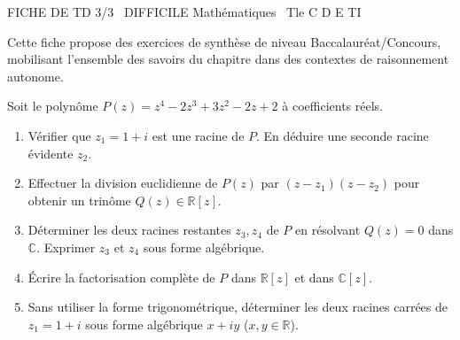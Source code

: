 \documentclass[11pt]{article}
\begin{document}
\begin{tcolorbox}[enhanced,colback=popink,colframe=popink,arc=10pt,boxrule=0pt,left=12pt,right=12pt,top=9pt,bottom=9pt]
{\color{white}\popxbold\small FICHE DE TD 3/3 \textbullet\ DIFFICILE \hfill Mathématiques \textbullet\ Tle C D E TI\par}
\end{tcolorbox}
\vspace{4pt}
Cette fiche propose des exercices de synthèse de niveau Baccalauréat/Concours, mobilisant l'ensemble des savoirs du chapitre dans des contextes de raisonnement autonome.

\begin{exercice}
Soit le polynôme $P(z) = z^4 - 2z^3 + 3z^2 - 2z + 2$ à coefficients réels.
\begin{enumerate}
    \item Vérifier que $z_1 = 1+i$ est une racine de $P$. En déduire une seconde racine évidente $z_2$.
    \item Effectuer la division euclidienne de $P(z)$ par $(z-z_1)(z-z_2)$ pour obtenir un trinôme $Q(z) \in \mathbb{R}[z]$.
    \item Déterminer les deux racines restantes $z_3, z_4$ de $P$ en résolvant $Q(z)=0$ dans $\mathbb{C}$. Exprimer $z_3$ et $z_4$ sous forme algébrique.
    \item Écrire la factorisation complète de $P$ dans $\mathbb{R}[z]$ et dans $\mathbb{C}[z]$.
    \item Sans utiliser la forme trigonométrique, déterminer les deux racines carrées de $z_1 = 1+i$ sous forme algébrique $x+iy$ ($x,y \in \mathbb{R}$).
\end{enumerate}
\end{exercice}
\end{document}
